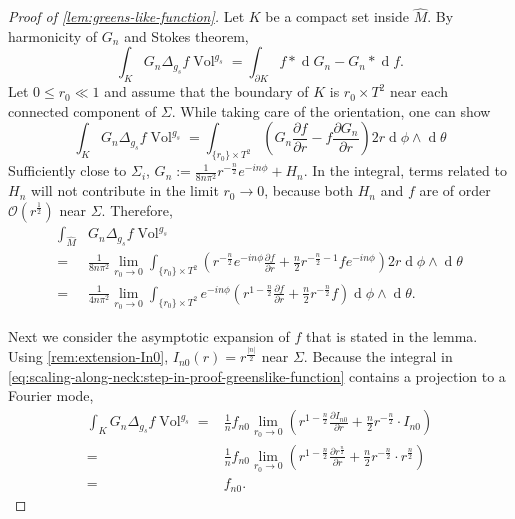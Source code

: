 \documentclass[preprint,12pt]{elsarticle}
\numberwithin{table}{section}
\newcommand{\del}{\partial}
\newcommand{\Vol}{\operatorname{Vol}}
\renewcommand{\d}{\operatorname{d}\!}
\renewcommand{\O}{\mathcal{O}}
\begin{document}
\begin{proof}[Proof of \cref{lem:greens-like-function}]
	Let $K$ be a compact set inside $\hat M$. By harmonicity of $G_n$ and Stokes theorem,
	$$
	\int_{K} G_n \Delta_{g_s} f \Vol^{g_s} 
	= \int_{\del K} f * \d G_n - G_n * \d f.
	$$
	Let $0 \le r_0 \ll 1$ and assume that the boundary of $K$ is ${r_0} \times T^2$ near each connected component of $\Sigma$. While taking care of the orientation, one can show
	$$
	\int_{K} G_n \Delta_{g_s} f \Vol^{g_s} 
	= \int_{\{r_0\} \times T^2} \left(G_n \frac{\del f}{\del r} - f \frac{\del G_n}{\del r}\right) 2 r \d \phi \wedge \d \theta
	$$
	Sufficiently close to $\Sigma_i$, $G_n := \frac{1}{8 n \pi^2} r^{-\frac{n}{2}} e^{- i n \phi} + H_n$. In the integral, terms related to $H_n$ will not contribute in the limit $r_0 \to 0$, because both $H_n$ and $f$ are of order $\O(r^{\frac{1}{2}})$ near $\Sigma$. Therefore,
	\begin{align}
		\int_{\hat M} &G_n \Delta_{g_s} f \Vol^{g_s} \\
	=& \frac{1}{8n \pi^2}  \lim \limits_{r_0 \to 0}\int_{\{r_0\} \times T^2} \left(r^{- \frac{n}{2}} e^{-i n \phi} \frac{\del f}{\del r} + \frac{n}{2} r^{- \frac{n}{2}-1} f e^{- i n \phi}\right) 2 r \d \phi \wedge \d \theta   \\
	\label{eq:scaling-along-neck:step-in-proof-greenslike-function}
	=&  \frac{1}{4 n \pi^2} \lim \limits_{r_0 \to 0}  \int_{\{r_0\} \times T^2} e^{-i n \phi}  \left(r^{1 - \frac{n}{2}} \frac{\del f}{\del r} + \frac{n}{2} r^{- \frac{n}{2}} f \right) \d \phi \wedge \d \theta.
	\end{align}

	Next we consider the asymptotic expansion of $f$ that is stated in the lemma.
	Using \cref{rem:extension-In0}, $I_{n0}(r) = r^{\frac{|n|}{2}}$ near $\Sigma$.
	Because the integral in \cref{eq:scaling-along-neck:step-in-proof-greenslike-function} contains a projection to a Fourier mode, 
	\begin{align}
		\int_{K} G_n \Delta_{g_s} f \Vol^{g_s} 
	=& \frac{1}{n} f_{n0}
	\lim \limits_{r_0 \to 0} \left(
	r^{1 - \frac{n}{2}} \frac{\del I_{n0}}{\del r} + \frac{n}{2} r^{- \frac{n}{2}} \cdot I_{n0}\right) \\
	=& \frac{1}{n} f_{n0}
	\lim \limits_{r_0 \to 0} \left(
	r^{1 - \frac{n}{2}} \frac{\del r^{\frac{n}{2}}}{\del r} + \frac{n}{2} r^{- \frac{n}{2}} \cdot r^{\frac{n}{2}} \right) \\
	=& f_{n0}.
	\end{align}
\end{proof}
\end{document}
